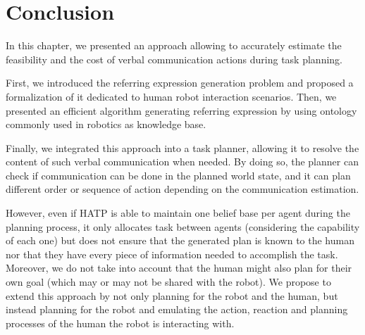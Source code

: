 \documentclass[a4paper,11pt,twoside]{StyleThese}
\begin{document}
\section{Conclusion}
In this chapter, we presented an approach allowing to accurately estimate the feasibility and the cost of verbal communication actions during task planning.

First, we introduced the referring expression generation problem and proposed a formalization of it dedicated to human robot interaction scenarios. Then, we presented an efficient algorithm generating referring expression by using ontology commonly used in robotics as knowledge base.

Finally, we integrated this approach into a task planner, allowing it to resolve the content of such verbal communication when needed. By doing so, the planner can check if communication can be done in the planned world state, and it can plan different order or sequence of action depending on the communication estimation.

However, even if HATP is able to maintain one belief base per agent during the planning process, it only allocates task between agents (considering the capability of each one) but does not ensure that the generated plan is known to the human nor that they have every piece of information needed to accomplish the task. Moreover, we do not take into account that the human might also plan for their own goal (which may or may not be shared with the robot). 
We propose to extend this approach by not only planning for the robot and the human, but instead planning for the robot and emulating the action, reaction and planning processes of the human the robot is interacting with.

\ifdefined{}
\else


\end{document}
